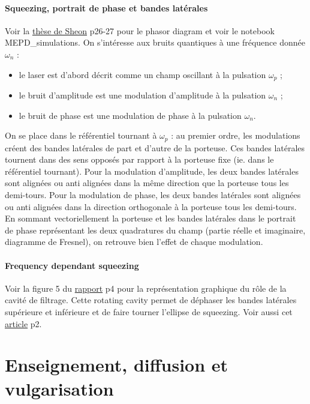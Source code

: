 \documentclass[12pt,a4paper]{article}
\begin{document}
\paragraph{Squeezing, portrait de phase et bandes latérales\\}
Voir la \href{https://gwic.ligo.org/assets/docs/theses/chua_thesis.pdf}{thèse de Sheon} p26-27 pour le phasor diagram et voir le notebook MEPD\_simulations.
On s'intéresse aux bruits quantiques à une fréquence donnée $\omega_n$ :
\begin{itemize}
\item le laser est d'abord décrit comme un champ oscillant à la pulsation $\omega_p$ ;
\item le bruit d'amplitude est une modulation d'amplitude à la pulsation $\omega_n$ ;
\item le bruit de phase est une modulation de phase à la pulsation $\omega_n$.
\end{itemize}
On se place dans le référentiel tournant à $\omega_p$ : au premier ordre, les modulations créent des bandes latérales de part et d'autre de la porteuse.
Ces bandes latérales tournent dans des sens opposés par rapport à la porteuse fixe (ie. dans le référentiel tournant).
Pour la modulation d'amplitude, les deux bandes latérales sont alignées ou anti alignées dans la même direction que la porteuse tous les demi-tours.
Pour la modulation de phase,  les deux bandes latérales sont alignées ou anti alignées dans la direction orthogonale à la porteuse tous les demi-tours.
En sommant vectoriellement la porteuse et les bandes latérales dans le portrait de phase représentant les deux quadratures du champ (partie réelle et imaginaire, diagramme de Fresnel), on retrouve bien l'effet de chaque modulation.

\paragraph{Frequency dependant squeezing\\}
Voir la figure 5 du \href{http://www.phys.ufl.edu/ireu/IREU2018/pdf_reports/LKB_Paris_final_report_Ana_Lam.pdf}{rapport} p4 pour la représentation graphique du rôle de la cavité de filtrage.
Cette rotating cavity permet de déphaser les bandes latérales supérieure et inférieure et de faire tourner l'ellipse de squeezing.
Voir aussi cet \href{https://journals.aps.org/prl/abstract/10.1103/PhysRevLett.124.171102}{article} p2.



\section{Enseignement, diffusion et vulgarisation}
\end{document}
